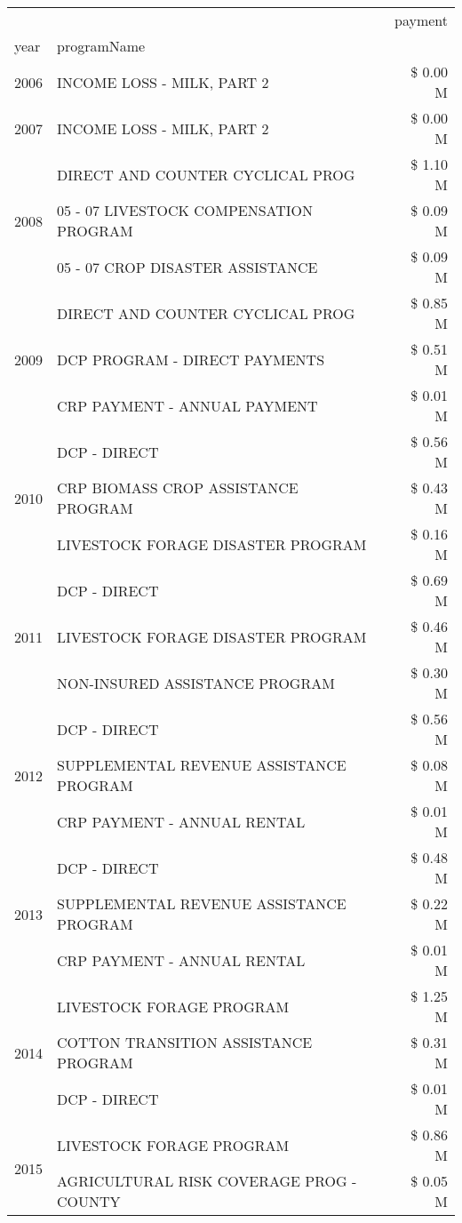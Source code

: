 \begin{tabular}{llr}
\toprule
 &  & payment \\
year & programName &  \\
\midrule
2006 & INCOME LOSS - MILK, PART 2 & \$ 0.00 M \\
\cline{1-3}
2007 & INCOME LOSS - MILK, PART 2 & \$ 0.00 M \\
\cline{1-3}
\multirow[t]{3}{*}{2008} & DIRECT AND COUNTER CYCLICAL PROG & \$ 1.10 M \\
 & 05 - 07 LIVESTOCK COMPENSATION PROGRAM & \$ 0.09 M \\
 & 05 - 07 CROP DISASTER ASSISTANCE & \$ 0.09 M \\
\cline{1-3}
\multirow[t]{3}{*}{2009} & DIRECT AND COUNTER CYCLICAL PROG & \$ 0.85 M \\
 & DCP PROGRAM - DIRECT PAYMENTS & \$ 0.51 M \\
 & CRP PAYMENT - ANNUAL PAYMENT & \$ 0.01 M \\
\cline{1-3}
\multirow[t]{3}{*}{2010} & DCP - DIRECT & \$ 0.56 M \\
 & CRP BIOMASS CROP ASSISTANCE PROGRAM & \$ 0.43 M \\
 & LIVESTOCK FORAGE DISASTER PROGRAM & \$ 0.16 M \\
\cline{1-3}
\multirow[t]{3}{*}{2011} & DCP - DIRECT & \$ 0.69 M \\
 & LIVESTOCK FORAGE DISASTER PROGRAM & \$ 0.46 M \\
 & NON-INSURED ASSISTANCE PROGRAM & \$ 0.30 M \\
\cline{1-3}
\multirow[t]{3}{*}{2012} & DCP - DIRECT & \$ 0.56 M \\
 & SUPPLEMENTAL REVENUE ASSISTANCE PROGRAM & \$ 0.08 M \\
 & CRP PAYMENT - ANNUAL RENTAL & \$ 0.01 M \\
\cline{1-3}
\multirow[t]{3}{*}{2013} & DCP - DIRECT & \$ 0.48 M \\
 & SUPPLEMENTAL REVENUE ASSISTANCE PROGRAM & \$ 0.22 M \\
 & CRP PAYMENT - ANNUAL RENTAL & \$ 0.01 M \\
\cline{1-3}
\multirow[t]{3}{*}{2014} & LIVESTOCK FORAGE PROGRAM & \$ 1.25 M \\
 & COTTON TRANSITION ASSISTANCE PROGRAM & \$ 0.31 M \\
 & DCP - DIRECT & \$ 0.01 M \\
\cline{1-3}
\multirow[t]{3}{*}{2015} & LIVESTOCK FORAGE PROGRAM & \$ 0.86 M \\
 & AGRICULTURAL RISK COVERAGE PROG - COUNTY & \$ 0.05 M \\

\end{tabular}

